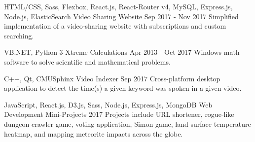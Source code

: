 \begin{cventries}
  \cventry
    {HTML/CSS, Sass, Flexbox, React.js, React-Router v4, MySQL, Express.js, Node.js, ElasticSearch} %
    {Video Sharing Website} %
    {} %
    {Sep 2017 - Nov 2017} %
    {
      Simplified implementation of a video-sharing website with subscriptions and custom searching.
    }

  \cventry
    {VB.NET, Python 3} %
    {Xtreme Calculations} %
    {} %
    {Apr 2013 - Oct 2017} %
    {
      Windows math software to solve scientific and mathematical problems.
    }

  \cventry
    {C++, Qt, CMUSphinx} %
    {Video Indexer} %
    {} %
    {Sep 2017} %
    {
      Cross-platform desktop application to detect the time(s) a given keyword was spoken in a given video.
    }

  \cventry
    {JavaScript, React.js, D3.js, Sass, Node.js, Express.js, MongoDB} %
    {Web Development Mini-Projects} %
    {} %
    {2017} %
    {
      Projects include URL shortener, rogue-like dungeon crawler game, voting application, Simon game, land surface temperature heatmap, and mapping meteorite impacts across the globe.
    }


\end{cventries}
